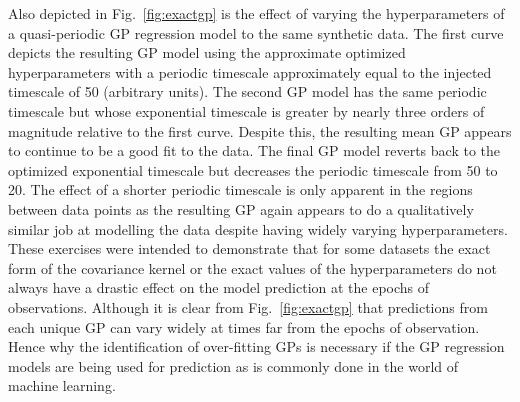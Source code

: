 Also depicted in Fig.~\ref{fig:exactgp} is the effect of varying the hyperparameters of
a quasi-periodic GP regression model to the same synthetic data. The first curve depicts
the resulting GP model using the approximate optimized hyperparameters with a periodic
timescale approximately equal to the injected timescale of 50 (arbitrary units). The second
GP model has the same periodic timescale but whose exponential timescale is greater by nearly
three orders of magnitude relative to the first curve.
Despite this, the resulting mean GP appears to continue to be a good
fit to the data. The final GP model reverts back to the optimized exponential timescale but
decreases the periodic timescale from 50 to 20. The effect of a shorter periodic timescale
is only apparent in the regions between data points as the resulting GP again appears to do
a qualitatively similar job at modelling the data despite having widely varying hyperparameters. \\

These exercises were intended to demonstrate that for some datasets the exact form of the covariance
kernel or the exact values of the hyperparameters do not always have a drastic effect on the
model prediction at the epochs of observations. Although it is clear from Fig.~\ref{fig:exactgp}
that predictions from each unique GP can vary widely at times far from the epochs of observation. 
Hence why the identification of over-fitting GPs is necessary if the GP regression models are being used 
for prediction as is commonly done in the world of machine learning.

